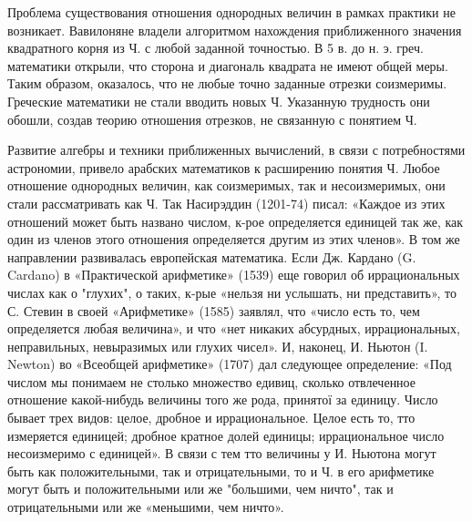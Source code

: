 \documentclass[10pt]{article}
\begin{document}
Проблема существования отношения однородных величин в рамках практики не возникает. Вавилоняне владели алгоритмом нахождения приближенного значения квадратного корня из Ч. с любой заданной точностью. В 5 в. до н. э. греч. математики открыли, что сторона и диагональ квадрата не имеют общей меры. Таким образом, оказалось, что не любые точно заданные отрезки соизмеримы. Греческие математики не стали вводить новых Ч. Указанную трудность они обошли, создав теорию отношения отрезков, не связанную с понятием Ч.



Развитие алгебры и техники приближенных вычислений, в связи с потребностями астрономии, привело арабских математиков к расширению понятия Ч. Любое отношение однородных величин, как соизмеримых, так и несоизмеримых, они стали рассматривать как Ч. Так Насирэддин (1201-74) писал: «Каждое из этих отношений может быть названо числом, к-рое определяется единицей так же, как один из членов этого отношения определяется другим из этих членов». В том же направлении развивалась европейская математика. Если Дж. Кардано (G. Cardano) в «Практической арифметике» (1539) еще говорил об иррациональных числах как о "глухих", о таких, к-рые «нельзя ни услышать, ни представить», то С. Стевин в своей «Арифметике» (1585) заявлял, что «число есть то, чем определяется любая величина», и что «нет никаких абсурдных, иррациональных, неправильных, невыразимых или глухих чисел». И, наконец, И. Ньютон (I. Newton) во «Всеобщей арифметике» (1707) дал следующее определение: «Под числом мы понимаем не столько множество едивиц, сколько отвлеченное отношение какой-нибудь величины того же рода, принятої за единицу. Число бывает трех видов: целое, дробное и иррациональное. Целое есть то, тто измеряется единицей; дробное кратное долей единицы; иррациональное число несоизмеримо с единицей». В связи с тем тто величины у И. Ньютона могут быть как положительными, так и отрицательными, то и Ч. в его арифметике могут быть и положительными или же "большими, чем ничто", так и отрицательными или же «меньшими, чем ничто».
\end{document}
